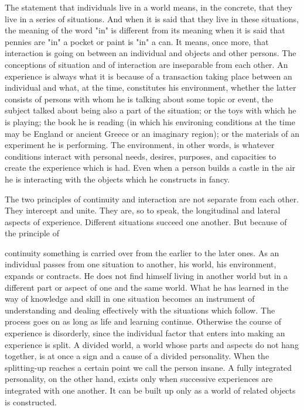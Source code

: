 The statement that individuals live in a world means, in the concrete, that they live in 
a series of situations. And when it is said that they live in these situations, the meaning of 
the word "in" is different from its meaning when it is said that pennies are "in" a pocket 
or paint is "in" a can. It means, once more, that interaction is going on between an 
individual and objects and other persons. The conceptions of situation and of interaction 
are inseparable from each other. An experience is always what it is because of a 
transaction taking place between an individual and what, at the time, constitutes his 
environment, whether the latter consists of persons with whom he is talking about some 
topic or event, the subject talked about being also a part of the situation; or the toys with 
which he is playing; the book he is reading (in which his environing conditions at the 
time may be England or ancient Greece or an imaginary region); or the materials of an 
experiment he is performing. The environment, in other words, is whatever conditions 
interact with personal needs, desires, purposes, and capacities to create the experience 
which is had. Even when a person builds a castle in the air he is interacting with the 
objects which he constructs in fancy. 

The two principles of continuity and interaction are not separate from each other. 
They intercept and unite. They are, so to speak, the longitudinal and lateral aspects of 
experience. Different situations succeed one another. But because of the principle of 



continuity something is carried over from the earlier to the later ones. As an individual 
passes from one situation to another, his world, his environment, expands or contracts. 
He does not find himself living in another world but in a different part or aspect of one 
and the same world. What he has learned in the way of knowledge and skill in one 
situation becomes an instrument of understanding and dealing effectively with the 
situations which follow. The process goes on as long as life and learning continue. 
Otherwise the course of experience is disorderly, since the individual factor that enters 
into making an experience is split. A divided world, a world whose parts and aspects do 
not hang together, is at once a sign and a cause of a divided personality. When the 
splitting-up reaches a certain point we call the person insane. A fully integrated 
personality, on the other hand, exists only when successive experiences are integrated 
with one another. It can be built up only as a world of related objects is constructed. 

